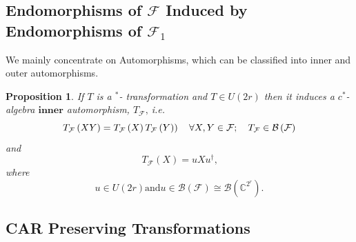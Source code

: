 \documentclass[aps, preprint]{revtex4}
\newtheorem{proposition}[theorem]{Proposition}
\begin{document}
\subsection{Endomorphisms of $\mathcal{F}$ Induced by Endomorphisms of $\mathcal{F}_{1}$}
We mainly concentrate on Automorphisms, which can be classified into inner and outer automorphisms. 


\begin{proposition}
If $T$ is a $^{ \ast }$- transformation and $T \in U \left (2 r\right )$ then it induces a $c^{ \ast }$-algebra $\mathbf{i} \mathbf{n} \mathbf{n} \mathbf{e} \mathbf{r}$ automorphism, $T_{\mathcal{F}}\text{,}$ i.e.
\begin{equation}T_{\mathcal{F}} \left (X Y) =T_{\mathcal{F}} \left (X\right ) T_{\mathcal{F}} \left (Y\right )\right )\text{\quad } \forall X ,Y \in \mathcal{F} ;\text{\quad }T_{\mathcal{F}} \in \mathcal{B} \left (\mathcal{F}\right )
\end{equation}and
\begin{equation}T_{\mathcal{F}} \left (X\right ) =u X u^{ \dag }\text{,}
\end{equation}where
\begin{equation}u \in U \left (2 r\right )\text{and}u \in \mathcal{B} \left (\mathcal{F}\right ) \cong \mathcal{B} \left (\mathbb{C}^{2^{r}}\right )\text{.}
\end{equation}
\end{proposition}

\subsection{CAR Preserving Transformations}
\end{document}
